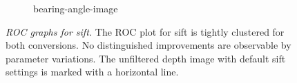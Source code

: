 \begin{figure}[ht]
\begin{subfigure}[t]{0.45\linewidth}
    \caption{\gls{bearing-angle-image}}
\end{subfigure}
\caption[\acrshort{ROC} graphs for \acrshort{sift}]{\emph{\acrshort{ROC} graphs for \acrshort{sift}.} The \acrshort{ROC} plot for \acrshort{sift} is tightly clustered for both conversions. No distinguished improvements are observable by parameter variations. The unfiltered depth image with default \acrshort{sift} settings is marked with a horizontal line.}\label{fig:roc_sift}
\end{figure}
